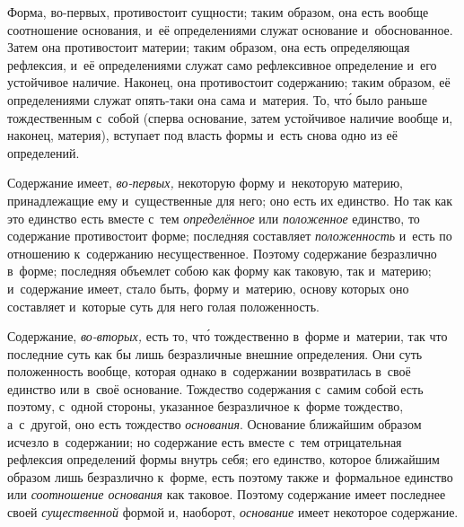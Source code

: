 
Форма, во-первых, противостоит сущности; таким образом, она есть вообще
соотношение основания, и~её определениями служат основание и~обоснованное.
Затем она противостоит материи; таким образом, она есть определяющая рефлексия,
и~её определениями служат само рефлексивное определение и~его устойчивое
наличие. Наконец, она противостоит содержанию; таким образом, её определениями
служат опять-таки она сама и~материя. То, чт\'{о} было раньше тождественным
с~собой (сперва основание, затем устойчивое наличие вообще и, наконец,
материя), вступает под власть формы и~есть снова одно из её определений.

Содержание имеет, {\em во-первых,} некоторую форму и~некоторую материю,
принадлежащие ему и~существенные для него; оно есть их единство. Но так как это
единство есть вместе с~тем {\em определённое} или {\em положенное} единство, то
содержание противостоит форме; последняя составляет {\em положенность} и~есть
по отношению к~содержанию несущественное. Поэтому содержание безразлично
в~форме; последняя объемлет собою как форму как таковую, так и~материю;
и~содержание имеет, стало быть, форму и~материю, основу которых оно составляет
и~которые суть для него голая положенность.

Содержание, {\em во-вторых,} есть то, чт\'{о} тождественно в~форме и~материи,
так что последние суть как бы лишь безразличные внешние определения. Они суть
положенность вообще, которая однако в~содержании возвратилась в~своё единство
или в~своё основание. Тождество содержания с~самим собой есть поэтому, с~одной
стороны, указанное безразличное к~форме тождество, а~с~другой, оно есть
тождество {\em основания}. Основание ближайшим образом исчезло в~содержании; но
содержание есть вместе с~тем отрицательная рефлексия определений формы внутрь
себя; его единство, которое ближайшим образом лишь безразлично к~форме, есть
поэтому также и~формальное единство или {\em соотношение основания} как
таковое. Поэтому содержание имеет последнее своей {\em существенной} формой и,
наоборот, {\em основание} имеет некоторое содержание.

